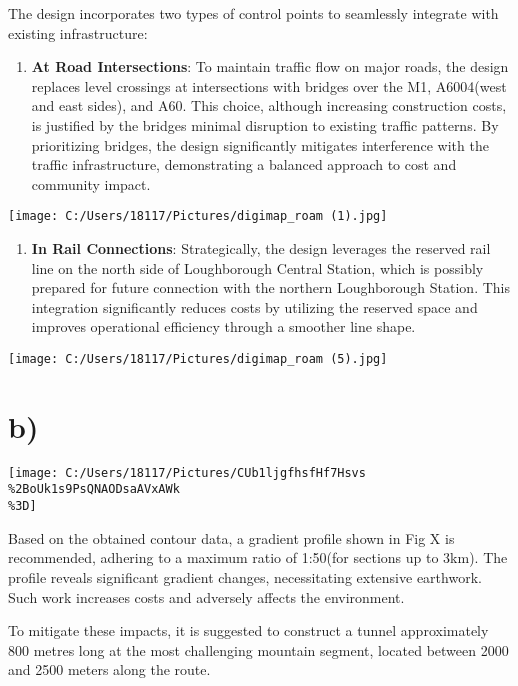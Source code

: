 \documentclass[
]{article}
\begin{document}
The design incorporates two types of control points to seamlessly
integrate with existing infrastructure:

\begin{enumerate}
\def\labelenumi{\arabic{enumi}.}
\item
  \textbf{At Road Intersections}: To maintain traffic flow on major
  roads, the design replaces level crossings at intersections with
  bridges over the M1, A6004(west and east sides), and A60. This choice,
  although increasing construction costs, is justified by the
  bridges\textquotesingle{} minimal disruption to existing traffic
  patterns. By prioritizing bridges, the design significantly mitigates
  interference with the traffic infrastructure, demonstrating a balanced
  approach to cost and community impact.
\end{enumerate}

\texttt{[image: C:/Users/18117/Pictures/digimap\_roam (1).jpg]}

\begin{enumerate}
\def\labelenumi{\arabic{enumi}.}
\item
  \textbf{In Rail Connections}: Strategically, the design leverages the
  reserved rail line on the north side of Loughborough Central Station,
  which is possibly prepared for future connection with the northern
  Loughborough Station. This integration significantly reduces costs by
  utilizing the reserved space and improves operational efficiency
  through a smoother line shape.
\end{enumerate}

\texttt{[image: C:/Users/18117/Pictures/digimap\_roam (5).jpg]}

\section{b)}\label{b}

\texttt{[image: C:/Users/18117/Pictures/CUb1ljgfhsfHf7Hsvs\\\%2BoUk1s9PsQNAODsaAVxAWk\\\%3D]}

Based on the obtained contour data, a gradient profile shown in Fig X is
recommended, adhering to a maximum ratio of 1:50(for sections up to
3km). The profile reveals significant gradient changes, necessitating
extensive earthwork. Such work increases costs and adversely affects the
environment.

To mitigate these impacts, it is suggested to construct a tunnel
approximately 800 metres long at the most challenging mountain segment,
located between 2000 and 2500 meters along the route.
\end{document}
